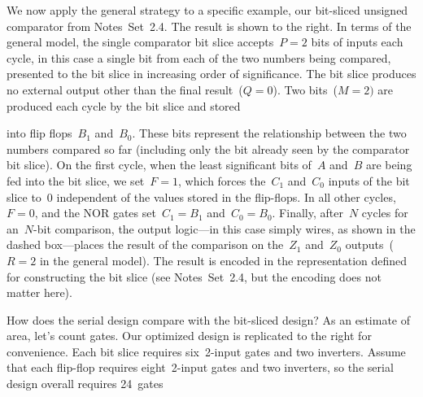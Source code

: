 \begin{minipage}{2.75in}
We now apply the general strategy to a specific example, our bit-sliced
unsigned comparator from Notes~Set~2.4.  The result is shown to the right.
In terms of the general model, the single comparator bit slice accepts~$P=2$
bits of inputs each cycle, in this case a single bit from each of the two
numbers being compared, presented to the bit slice in increasing order
of significance.  The bit slice produces no external output other than
the final result~($Q=0$).  Two bits~($M=2)$ are produced each cycle by 
the bit slice and stored\linebreak
\end{minipage}\hspace{0.25in}%
\begin{minipage}{3.5in}
\vspace{12pt}
\end{minipage}\mpdone

into flip flops~$B_1$ and~$B_0$.  These bits
represent the relationship between the two numbers compared so far
(including only the bit already seen by the comparator bit slice).
On the first cycle, when the least significant bits of~$A$ and~$B$ are
being fed into the bit slice, we set~$F=1$, which forces the~$C_1$ 
and~$C_0$ inputs of the bit slice to~0 independent of the values stored
in the flip-flops.  In all other cycles,~$F=0$, and the NOR gates
set~$C_1=B_1$ and~$C_0=B_0$.  Finally, after~$N$ cycles for an~\mbox{$N$-bit}
comparison, the output logic---in this case simply wires, as shown 
in the dashed box---places the result of the comparison on 
the~$Z_1$ and~$Z_0$ outputs~($R=2$ in the general model).  
The result is encoded in the 
representation defined for constructing the bit slice (see Notes~Set~2.4,
but the encoding does not matter here).

\begin{minipage}{2.15in}
How does the serial design compare with the bit-sliced design?
%
As an estimate of area, let's count gates.  Our optimized 
design is replicated to the right for convenience.  
%
Each bit slice requires six~\mbox{2-input} gates and two inverters.  
%
Assume that each 
flip-flop requires eight~\mbox{2-input} gates and two inverters,
so the serial design overall requires 24~gates\linebreak
\end{minipage}\hspace{0.25in}%
\begin{minipage}{4.1in}
\vspace{12pt}
\end{minipage}\mpdone

